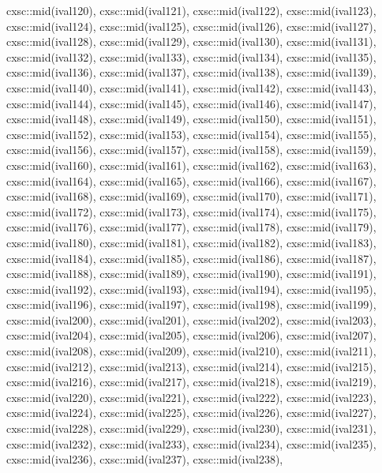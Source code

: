 \begin{DoxyCode}
{  cxsc::mid(ival120),
  cxsc::mid(ival121),
  cxsc::mid(ival122),
  cxsc::mid(ival123),
  cxsc::mid(ival124),
  cxsc::mid(ival125),
  cxsc::mid(ival126),
  cxsc::mid(ival127),
  cxsc::mid(ival128),
  cxsc::mid(ival129),
  cxsc::mid(ival130),
  cxsc::mid(ival131),
  cxsc::mid(ival132),
  cxsc::mid(ival133),
  cxsc::mid(ival134),
  cxsc::mid(ival135),
  cxsc::mid(ival136),
  cxsc::mid(ival137),
  cxsc::mid(ival138),
  cxsc::mid(ival139),
  cxsc::mid(ival140),
  cxsc::mid(ival141),
  cxsc::mid(ival142),
  cxsc::mid(ival143),
  cxsc::mid(ival144),
  cxsc::mid(ival145),
  cxsc::mid(ival146),
  cxsc::mid(ival147),
  cxsc::mid(ival148),
  cxsc::mid(ival149),
  cxsc::mid(ival150),
  cxsc::mid(ival151),
  cxsc::mid(ival152),
  cxsc::mid(ival153),
  cxsc::mid(ival154),
  cxsc::mid(ival155),
  cxsc::mid(ival156),
  cxsc::mid(ival157),
  cxsc::mid(ival158),
  cxsc::mid(ival159),
  cxsc::mid(ival160),
  cxsc::mid(ival161),
  cxsc::mid(ival162),
  cxsc::mid(ival163),
  cxsc::mid(ival164),
  cxsc::mid(ival165),
  cxsc::mid(ival166),
  cxsc::mid(ival167),
  cxsc::mid(ival168),
  cxsc::mid(ival169),
  cxsc::mid(ival170),
  cxsc::mid(ival171),
  cxsc::mid(ival172),
  cxsc::mid(ival173),
  cxsc::mid(ival174),
  cxsc::mid(ival175),
  cxsc::mid(ival176),
  cxsc::mid(ival177),
  cxsc::mid(ival178),
  cxsc::mid(ival179),
  cxsc::mid(ival180),
  cxsc::mid(ival181),
  cxsc::mid(ival182),
  cxsc::mid(ival183),
  cxsc::mid(ival184),
  cxsc::mid(ival185),
  cxsc::mid(ival186),
  cxsc::mid(ival187),
  cxsc::mid(ival188),
  cxsc::mid(ival189),
  cxsc::mid(ival190),
  cxsc::mid(ival191),
  cxsc::mid(ival192),
  cxsc::mid(ival193),
  cxsc::mid(ival194),
  cxsc::mid(ival195),
  cxsc::mid(ival196),
  cxsc::mid(ival197),
  cxsc::mid(ival198),
  cxsc::mid(ival199),
  cxsc::mid(ival200),
  cxsc::mid(ival201),
  cxsc::mid(ival202),
  cxsc::mid(ival203),
  cxsc::mid(ival204),
  cxsc::mid(ival205),
  cxsc::mid(ival206),
  cxsc::mid(ival207),
  cxsc::mid(ival208),
  cxsc::mid(ival209),
  cxsc::mid(ival210),
  cxsc::mid(ival211),
  cxsc::mid(ival212),
  cxsc::mid(ival213),
  cxsc::mid(ival214),
  cxsc::mid(ival215),
  cxsc::mid(ival216),
  cxsc::mid(ival217),
  cxsc::mid(ival218),
  cxsc::mid(ival219),
  cxsc::mid(ival220),
  cxsc::mid(ival221),
  cxsc::mid(ival222),
  cxsc::mid(ival223),
  cxsc::mid(ival224),
  cxsc::mid(ival225),
  cxsc::mid(ival226),
  cxsc::mid(ival227),
  cxsc::mid(ival228),
  cxsc::mid(ival229),
  cxsc::mid(ival230),
  cxsc::mid(ival231),
  cxsc::mid(ival232),
  cxsc::mid(ival233),
  cxsc::mid(ival234),
  cxsc::mid(ival235),
  cxsc::mid(ival236),
  cxsc::mid(ival237),
  cxsc::mid(ival238),
}
\end{DoxyCode}
